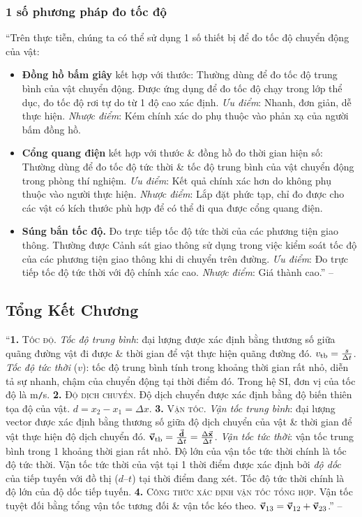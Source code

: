 \documentclass{article}
\numberwithin{equation}{section}
\begin{document}
\subsubsection{1 số phương pháp đo tốc độ}
``Trên thực tiễn, chúng ta có thể sử dụng 1 số thiết bị để đo tốc độ chuyển động của vật:
\begin{itemize}
	\item \textbf{Đồng hồ bấm giây} kết hợp với thước: Thường dùng để đo tốc độ trung bình của vật chuyển động. Được ứng dụng để đo tốc độ chạy trong lớp thể dục, đo tốc độ rơi tự do từ 1 độ cao xác định. \textit{Ưu điểm}: Nhanh, đơn giản, dễ thực hiện. \textit{Nhược điểm}: Kém chính xác do phụ thuộc vào phản xạ của người bấm đồng hồ.
	\item \textbf{Cổng quang điện} kết hợp với thước \& đồng hồ đo thời gian hiện số: Thường dùng để đo tốc độ tức thời \& tốc độ trung bình của vật chuyển động trong phòng thí nghiệm. \textit{Ưu điểm}: Kết quả chính xác hơn do không phụ thuộc vào người thực hiện. \textit{Nhược điểm}: Lắp đặt phức tạp, chỉ đo được cho các vật có kích thước phù hợp để có thể đi qua được cổng quang điện.
	\item \textbf{Súng bắn tốc độ.} Đo trực tiếp tốc độ tức thời của các phương tiện giao thông. Thường được Cảnh sát giao thông sử dụng trong việc kiểm soát tốc độ của các phương tiện giao thông khi di chuyển trên đường. \textit{Ưu điểm}: Đo trực tiếp tốc độ tức thời với độ chính xác cao. \textit{Nhược điểm}: Giá thành cao.'' -- \cite[pp. 38--39]{SGK_Vat_Ly_10_Chan_Troi_Sang_Tao}
\end{itemize}

\subsection{Tổng Kết Chương}
``\textbf{1.} \textsc{Tốc độ.} \textit{Tốc độ trung bình}: đại lượng được xác định bằng thương số giữa quãng đường vật đi được \& thời gian để vật thực hiện quãng đường đó. $v_{\rm tb} = \frac{s}{\Delta t}$. \textit{Tốc độ tức thời} ($v$): tốc độ trung bình tính trong khoảng thời gian rất nhỏ, diễn tả sự nhanh, chậm của chuyển động tại thời điểm đó. Trong hệ SI, đơn vị của tốc độ là m\texttt{/}s. \textbf{2.} \textsc{Độ dịch chuyển.} Độ dịch chuyển được xác định bằng độ biến thiên tọa độ của vật. $d = x_2 - x_1 = \Delta x$. \textbf{3.} \textsc{Vận tốc.} \textit{Vận tốc trung bình}: đại lượng vector được xác định bằng thương số giữa độ dịch chuyển của vật \& thời gian để vật thực hiện độ dịch chuyển đó. $\vec{\bf v}_{\rm tb} = \frac{\vec{\bf d}}{\Delta t} = \frac{\Delta\vec{\bf x}}{\Delta t}$. \textit{Vận tốc tức thời}: vận tốc trung bình trong 1 khoảng thời gian rất nhỏ. Độ lớn của vận tốc tức thời chính là tốc độ tức thời. Vận tốc tức thời của vật tại 1 thời điểm được xác định bởi \textit{độ dốc} của tiếp tuyến với đồ thị ($d$--$t$) tại thời điểm đang xét. Tốc độ tức thời chính là độ lớn của độ dốc tiếp tuyến. \textbf{4.} \textsc{Công thức xác định vận tốc tổng hợp.} Vận tốc tuyệt đối bằng tổng vận tốc tương đối \& vận tốc kéo theo. $\vec{\bf v}_{13} = \vec{\bf v}_{12} + \vec{\bf v}_{23}$.'' -- \cite[p. 39]{SGK_Vat_Ly_10_Chan_Troi_Sang_Tao}
\end{document}
